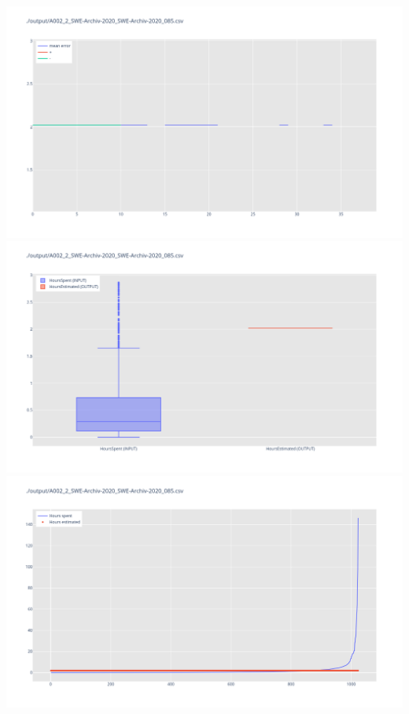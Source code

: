 \includegraphics[width=\textwidth]{Scripts/output/A002_2_SWE-Archiv-2020_SWE-Archiv-2020_085.csv.error_distribution.png}
\includegraphics[width=\textwidth]{Scripts/output/A002_2_SWE-Archiv-2020_SWE-Archiv-2020_085.csv.png}
\includegraphics[width=\textwidth]{Scripts/output/A002_2_SWE-Archiv-2020_SWE-Archiv-2020_085.csv.scatter.png}
